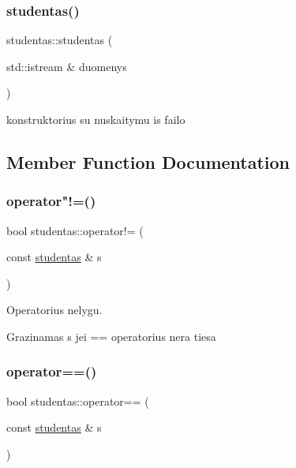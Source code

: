 \subsubsection{\texorpdfstring{studentas()}{studentas()}\hspace{0.1cm}{\footnotesize\ttfamily [2/2]}}
{\footnotesize\ttfamily studentas\+::studentas (\begin{DoxyParamCaption}\item[{std\+::istream \&}]{duomenys }\end{DoxyParamCaption})}

konstruktorius su nuskaitymu is failo 

\subsection{Member Function Documentation}
\mbox{\label{classstudentas_a10674181ae77cc4fe4b65fc0eddf2e8b}} 
\subsubsection{\texorpdfstring{operator"!=()}{operator!=()}}
{\footnotesize\ttfamily bool studentas\+::operator!= (\begin{DoxyParamCaption}\item[{const \mbox{\hyperlink{classstudentas}{studentas}} \&}]{s }\end{DoxyParamCaption})}



Operatorius nelygu. 

Grazinamas s jei == operatorius nera tiesa \mbox{\label{classstudentas_a0ad8d0b569e5beb7b34238fa87267b77}} 
\subsubsection{\texorpdfstring{operator==()}{operator==()}}
{\footnotesize\ttfamily bool studentas\+::operator== (\begin{DoxyParamCaption}\item[{const \mbox{\hyperlink{classstudentas}{studentas}} \&}]{s }\end{DoxyParamCaption})}



